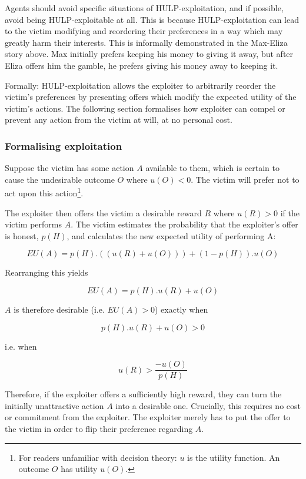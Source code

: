 \documentclass{article}
\begin{document}
Agents should avoid specific situations of HULP-exploitation, and if possible, avoid being HULP-exploitable at all. This is because HULP-exploitation can lead to the victim modifying and reordering their preferences in a way which may greatly harm their interests. This is informally demonstrated in the Max-Eliza story above. Max initially prefers keeping his money to giving it away, but after Eliza offers him the gamble, he prefers giving his money away to keeping it.

Formally: HULP-exploitation allows the exploiter to arbitrarily reorder the victim's preferences by presenting offers which modify the expected utility of the victim's actions. The following section formalises how exploiter can compel or prevent any action from the victim at will, at no personal cost. 

\subsubsection{Formalising exploitation}

Suppose the victim has some action \(A\) available to them, which is certain to cause the undesirable outcome \(O\) where \(u(O) < 0\). The victim will prefer not to act upon this action\footnote{For readers unfamiliar with decision theory: \(u\) is the utility function. An outcome \(O\) has utility \(u(O)\).}.

The exploiter then offers the victim a desirable reward \(R\) where \(u(R) > 0\) if the victim performs \(A\). The victim estimates the probability that the exploiter's offer is honest, \(p(H)\), and calculates the new expected utility of performing A:

\[EU(A) = p(H).((u(R)+u(O))) + (1-p(H)).u(O)\]

Rearranging this yields

\[EU(A) = p(H).u(R) + u(O)\]

\(A\) is therefore desirable (i.e. \(EU(A)>0\)) exactly when

\[p(H).u(R) + u(O) > 0\]

i.e. when

\[u(R) > \frac{-u(O)}{p(H)}\]

Therefore, if the exploiter offers a sufficiently high reward, they can turn the initially unattractive action \(A\) into a desirable one. Crucially, this requires no cost or commitment from the exploiter. The exploiter merely has to put the offer to the victim in order to flip their preference regarding \(A\).
\end{document}
